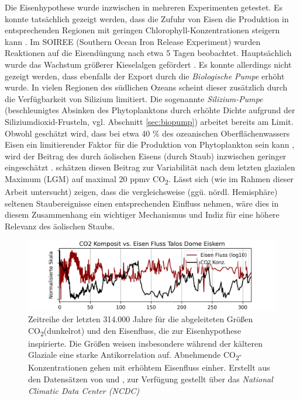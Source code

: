\documentclass[12pt,a4paper,onecolumn]{scrartcl}
\newcommand{\cotwo}{CO\textsubscript{2}}
\begin{document}
Die Eisenhypothese wurde inzwischen in mehreren Experimenten getestet. Es konnte tatsächlich gezeigt werden, dass die Zufuhr von Eisen die Produktion in entsprechenden Regionen mit geringen Chlorophyll-Konzentrationen steigern kann \citep{Boyd.2007}. Im SOIREE (Southern Ocean Iron Release Experiment) wurden Reaktionen auf die Eisendüngung nach etwa 5 Tagen beobachtet. Hauptsächlich wurde das Wachstum größerer Kieselalgen gefördert \citep{Trull.2001}. Es konnte allerdings nicht gezeigt werden, dass ebenfalls der Export durch die \textit{Biologische Pumpe} erhöht wurde. In vielen Regionen des südlichen Ozeans scheint dieser zusätzlich durch die Verfügbarkeit von Silizium limitiert. Die sogenannte \textit{Silizium-Pumpe} (beschleunigtes Absinken des Phytoplanktons durch erhöhte Dichte aufgrund der Siliziumdioxid-Frusteln, vgl. Abschnitt \ref{sec:biopump}) arbeitet bereits am Limit. Obwohl geschätzt wird, dass bei etwa 40 \% des ozeanischen Oberflächenwassers Eisen ein limitierender Faktor für die Produktion von Phytoplankton sein kann \citep{Emerson.2009}, wird der Beitrag des durch äolischen Eisens (durch Staub) inzwischen geringer eingeschätzt \citep{Tagliabue.2017}. \citet{Vallelonga.2013} schätzen diesen Beitrag zur Variabilität nach dem letzten glazialen Maximum (LGM) auf maximal 20 ppmv \cotwo . Lässt sich (wie im Rahmen dieser Arbeit untersucht) zeigen, dass die vergleichsweise (ggü. nördl. Hemisphäre) seltenen Staubereignisse einen entsprechenden Einfluss nehmen, wäre dies in diesem Zusammenhang ein wichtiger Mechanismus und Indiz für eine höhere Relevanz des äolischen Staubs.

\begin{figure}
\centering
\includegraphics[width=\textwidth]{bilder/co2_iron.png}
\caption{ Zeitreihe der letzten 314.000 Jahre für die abgeleiteten Größen \cotwo (dunkelrot) und den Eisenfluss, die zur Eisenhypothese inspirierte. Die Größen weisen insbesondere während der kälteren Glaziale eine starke Antikorrelation auf. Abnehmende \cotwo -Konzentrationen gehen mit erhöhtem Eisenfluss einher. Erstellt aus den Datensätzen von \cite{Bereiter.2015} und \cite{Vallelonga.2013}, zur Verfügung gestellt über das \textit{National Climatic Data Center (NCDC)}}   \label{fig:co2iron}
\end{figure}
\end{document}
